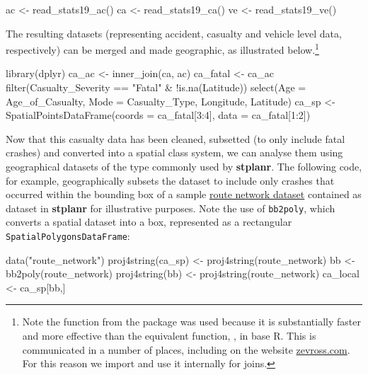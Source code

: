 \begin{Schunk}
\begin{Sinput}
ac <- read_stats19_ac()
ca <- read_stats19_ca()
ve <- read_stats19_ve()
\end{Sinput}
\end{Schunk}

The resulting datasets (representing accident, casualty and vehicle
level data, respectively) can be merged and made geographic, as
illustrated below.\footnote{
Note the  function from the  package was used because it is substantially faster and more effective than the equivalent function, , in base R.
This is communicated in a number of places, including on the website \href{http://zevross.com/blog/2014/04/30/mini-post-for-large-tables-in-r-dplyrs-function-inner_join-is-much-faster-than-merge/}{zevross.com}. For this reason we import  and use it internally for joins.}

\begin{Schunk}
\begin{Sinput}
library(dplyr)
ca_ac <- inner_join(ca, ac)
ca_fatal <- ca_ac %
  filter(Casualty_Severity == "Fatal" & !is.na(Latitude)) %
  select(Age = Age_of_Casualty, Mode = Casualty_Type, Longitude, Latitude)
ca_sp <- SpatialPointsDataFrame(coords = ca_fatal[3:4], data = ca_fatal[1:2])
\end{Sinput}
\end{Schunk}

Now that this casualty data has been cleaned, subsetted (to only include
fatal crashes) and converted into a spatial class system, we can
analyse them using geographical datasets of the type commonly used by
\textbf{stplanr}. The following code, for example, geographically
subsets the dataset to include only crashes that occurred within the
bounding box of a sample
\href{https://github.com/ropensci/stplanr/blob/master/data/route_network.rda?raw=true}{route
network dataset} contained as dataset in \textbf{stplanr} for illustrative purposes.
Note the use of \texttt{bb2poly}, which converts a spatial
dataset into a box, represented as a rectangular
\texttt{SpatialPolygonsDataFrame}:

\begin{Schunk}
\begin{Sinput}
data("route_network")
proj4string(ca_sp) <- proj4string(route_network)
bb <- bb2poly(route_network)
proj4string(bb) <- proj4string(route_network)
ca_local <- ca_sp[bb,]
\end{Sinput}
\end{Schunk}

